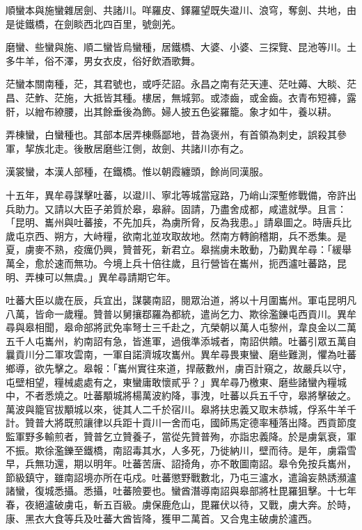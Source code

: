\begin{pinyinscope}
 順蠻本與施蠻雜居劍、共諸川。咩羅皮、鐸羅望既失邆川、浪穹，奪劍、共地，由是徙鐵橋，在劍睒西北四百里，號劍羌。



 磨蠻、些蠻與施、順二蠻皆烏蠻種，居鐵橋、大婆、小婆、三探覽、昆池等川。土多牛羊，俗不澤，男女衣皮，俗好飲酒歌舞。



 茫蠻本關南種，茫，其君號也，或呼茫詔。永昌之南有茫天連、茫吐薅、大睒、茫昌、茫鮓、茫施，大抵皆其種。樓居，無城郭。或漆齒，或金齒。衣青布短褲，露骭，以繒布繚腰，出其餘垂後為飾。婦人披五色娑羅籠。象才如牛，養以耕。



 弄棟蠻，白蠻種也。其部本居弄棟縣鄙地，昔為褒州，有首領為刺史，誤殺其參軍，挈族北走。後散居磨些江側，故劍、共諸川亦有之。



 漢裳蠻，本漢人部種，在鐵橋。惟以朝霞纏頭，餘尚同漢服。



 十五年，異牟尋謀擊吐蕃，以邆川、寧北等城當寇路，乃峭山深塹修戰備，帝許出兵助力。又請以大臣子弟質於皋，皋辭。固請，乃盡舍成都，咸遣就學。且言：「昆明、巂州與吐蕃接，不先加兵，為虜所脅，反為我患。」請皋圖之。時唐兵比歲屯京西、朔方，大峙糧，欲南北並攻取故地。然南方轉餉稽期，兵不悉集。是夏，虜麥不熟，疫癘仍興，贊普死，新君立。皋揣虜未敢動，乃勸異牟尋：「緩舉萬全，愈於速而無功。今境上兵十倍往歲，且行營皆在巂州，扼西瀘吐蕃路，昆明、弄棟可以無虞。」異牟尋請期它年。



 吐蕃大臣以歲在辰，兵宜出，謀襲南詔，閱眾治道，將以十月圍巂州。軍屯昆明凡八萬，皆命一歲糧。贊普以舅攘鄀羅為都統，遣尚乞力、欺徐濫鑠屯西貢川。異牟尋與皋相聞，皋命部將武免率弩士三千赴之，亢榮朝以萬人屯黎州，韋良金以二萬五千人屯巂州，約南詔有急，皆進軍，過俄準添城者，南詔供饋。吐蕃引眾五萬自曩貢川分二軍攻雲南，一軍自諾濟城攻巂州。異牟尋畏東蠻、磨些難測，懼為吐蕃鄉導，欲先擊之。皋報：「巂州實往來道，捍蔽數州，虜百計窺之，故嚴兵以守，屯壁相望，糧械處處有之，東蠻庸敢懷貳乎？」異牟尋乃檄東、磨些諸蠻內糧城中，不者悉燒之。吐蕃顒城將楊萬波約降，事洩，吐蕃以兵五千守，皋將擊破之。萬波與籠官拔顒城以來，徙其人二千於宿川。皋將扶忠義又取末恭城，俘系牛羊千計。贊普大將既煎讓律以兵距十貢川一舍而屯，國師馬定德率種落出降。西貢節度監軍野多輸煎者，贊普乞立贊養子，當從先贊普殉，亦詣忠義降。於是虜氣衰，軍不振。欺徐濫鑠至鐵橋，南詔毒其水，人多死，乃徙納川，壁而待。是年，虜霜雪早，兵無功還，期以明年。吐蕃苦唐、詔掎角，亦不敢圖南詔。皋令免按兵巂州，節級鎮守，雖南詔境亦所在屯戍。吐蕃懲野戰數北，乃屯三瀘水，遣論妄熱誘瀕瀘諸蠻，復城悉攝。悉攝，吐蕃險要也。蠻酋潛導南詔與皋部將杜毘羅狙擊。十七年春，夜絕瀘破虜屯，斬五百級。虜保鹿危山，毘羅伏以待，又戰，虜大奔。於時，康、黑衣大食等兵及吐蕃大酋皆降，獲甲二萬首。又合鬼主破虜於瀘西。




\end{pinyinscope}
